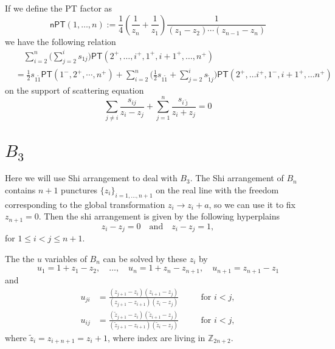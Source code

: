 \documentclass[12pt]{article}
\theoremstyle{definition}
\theoremstyle{plain}
\begin{document}
If we define the PT factor as 
\[
\mathsf{nPT}(1,\dots,n):=
\frac{1}{4}\left(\frac{1}{z_n}+\frac{1}{z_1}\right)\frac{1}{\left(z_1-z_2\right) \cdots \left(z_{n-1}-z_n\right)}
\]
we have the following relation
\begin{align*}
&\quad \sum_{i=2}^{n}\biggl(\sum_{j=2}^{i}s_{1j}\biggr)\mathsf{PT}(2^{+},\ldots,i^{+},1^{+},i{+}1^{+},\ldots, n^{+}) \\
&=\frac{1}{2}s_{1\tilde{1}}\mathsf{PT}(1^{-},2^{+},\cdots,n^{+}) +\sum_{i=2}^{n}
\biggl(\frac{1}{2}s_{1\tilde{1}}+\sum_{j=2}^{i}s_{\tilde{1}j}\biggr)\mathsf{PT}(2^{+},\ldots i^{+},1^{-},i{+}1^{+},\ldots n^{+})
\end{align*}
on the support of scattering equation
\[
\sum_{j\neq i} \frac{s_{ij}}{z_{i}-z_{j}}+ \sum_{j=1}^{n} \frac{s_{i\tilde{\jmath}}}{z_{i}+z_{j}} =0
\]

\section{$B_3$}

Here we will use Shi arrangement to deal with $B_3$. The Shi arrangement of $B_n$ contains $n+1$ punctures $\{z_i\}_{i=1,\dots,n+1}$ on the real line with the freedom corresponding to the global transformation $z_i\to z_i+a$, so we can use it to fix $z_{n+1}=0$. Then the shi arrangement is given by the following hyperplains
\[
    z_i-z_j=0\quad \text{and}\quad z_i-z_j=1,
\]
for $1\leq i<j\leq n+1$. 

The the $u$ variables of $B_n$ can be solved by these $z_i$ by 
\[
    u_1=1+z_1-z_2,\quad \dots,\quad u_{n}=1+z_{n}-z_{n+1},\quad u_{n+1}=z_{n+1}-z_1
\]
and 
\[
\begin{aligned}
    u_{ji}&=\frac{(z_{j+1}-z_{i})(z_{i+1}-z_j)}{(z_{j+1}-z_{i+1})(z_i-z_j)}\quad &&\text{for $i<j$},\\
    u_{ij}&=\frac{(\tilde z_{j+1}-z_{i})(\tilde z_{i+1}-z_j)}{(\tilde z_{j+1}-z_{i+1})(\tilde z_i-z_j)}\quad &&\text{for $i<j$},
\end{aligned}
\]
where $\tilde{z}_i=z_{i+n+1}=z_{i}+1$, where index are living in $\mathbb Z_{2n+2}$.
\end{document}
